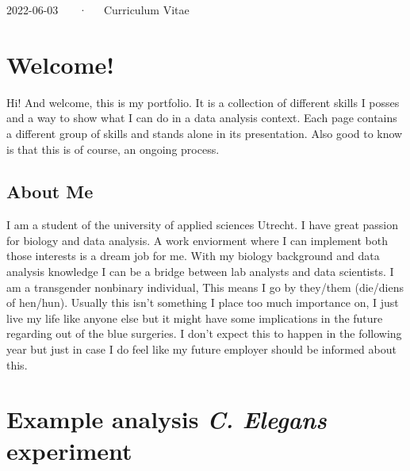 \documentclass[11pt,a4paper,]{awesome-cv}
\begin{document}
\makecvheader

\makecvfooter
  {2022-06-03}
    {~~~·~~~Curriculum Vitae}
  {\thepage}





\hypertarget{welcome}{%
\chapter{Welcome!}\label{welcome}}

Hi! And welcome, this is my portfolio. It is a collection of different
skills I posses and a way to show what I can do in a data analysis
context. Each page contains a different group of skills and stands alone
in its presentation. Also good to know is that this is of course, an
ongoing process.

\hypertarget{about-me}{%
\section{About Me}\label{about-me}}

I am a student of the university of applied sciences Utrecht. I have
great passion for biology and data analysis. A work enviorment where I
can implement both those interests is a dream job for me. With my
biology background and data analysis knowledge I can be a bridge between
lab analysts and data scientists. I am a transgender nonbinary
individual, This means I go by they/them (die/diens of hen/hun). Usually
this isn't something I place too much importance on, I just live my life
like anyone else but it might have some implications in the future
regarding out of the blue surgeries. I don't expect this to happen in
the following year but just in case I do feel like my future employer
should be informed about this.

\hypertarget{example-analysis-c.-elegans-experiment}{%
\chapter{\texorpdfstring{Example analysis \emph{C. Elegans}
experiment}{Example analysis C. Elegans experiment}}\label{example-analysis-c.-elegans-experiment}}
\end{document}
